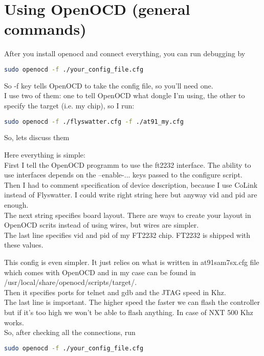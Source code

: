 \documentclass[11pt]{article}
\begin{document}
	\section{Using OpenOCD (general commands)}
		After you install openocd and connect everything, you can run debugging by
		\begin{lstlisting}[language=bash]
sudo openocd -f ./your_config_file.cfg
		\end{lstlisting}
		So -f key tells OpenOCD to take the config file, so you'll need one.\\
		I use two of them: one to tell OpenOCD what dongle I'm using, the other to specify the target (i.e. my chip), so I run:
		\begin{lstlisting}[language=bash]
sudo openocd -f ./flyswatter.cfg -f ./at91_my.cfg
		\end{lstlisting}
		So, lets discuss them
		
		Here everything is simple:\\
		First I tell the OpenOCD programm to use the ft2232 interface. The ability to use interfaces depends on the --enable-... keys passed to the configure script.\\
		Then I had to comment specification of device description, because I use CoLink instead of Flyswatter. I could write right string here but anyway vid and pid are enough.\\
		The next string specifies board layout. There are ways to create your layout in OpenOCD scrits instead of using wires, but wires are simpler.\\
		The last line specifies vid and pid of my FT2232 chip. FT2232 is shipped with these values.
		
		This config is even simpler. It just relies on what is written in at91sam7sx.cfg file which comes with OpenOCD and in my case can be found in /usr/local/share/openocd/scripts/target/.\\
		Then it specifies ports for telnet and gdb and the JTAG speed in Khz.\\
		The last line is important. The higher speed the faster we can flash the controller but if it's too high we won't be able to flash anything. In case of NXT 500 Khz works.\\
		So, after checking all the connections, run
		\begin{lstlisting}[language=bash]
sudo openocd -f ./your_config_file.cfg
		\end{lstlisting}
\end{document}
